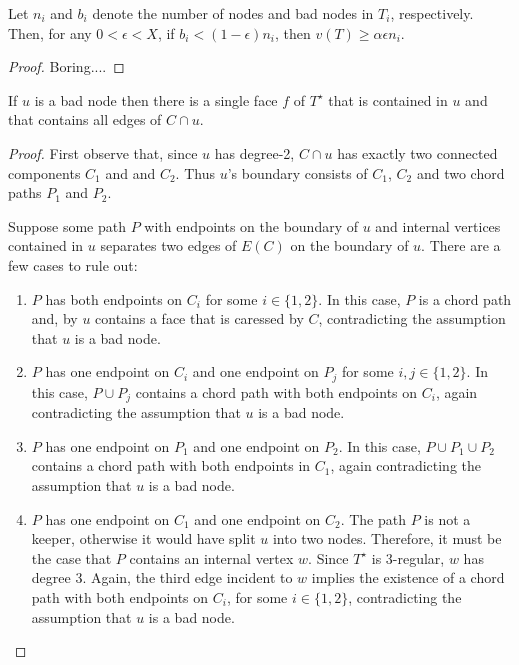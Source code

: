 \documentclass{patmorin}
\newcommand{\dual}[1]{{#1}^\star}
\begin{document}
\begin{lem}
   Let $n_i$ and $b_i$ denote the number of nodes and bad nodes in $T_i$, respectively.  Then, for any $0 < \epsilon < X$, if $b_i < (1-\epsilon)n_i$, then $v(T)\ge \alpha \epsilon n_i$.
\end{lem}

\begin{proof}
Boring....
\end{proof}


\begin{lem}
If $u$ is a bad node then there is a single face $f$ of $\dual{T}$ that is contained in $u$ and that contains all edges of $C\cap u$.
\end{lem}

\begin{proof}
   First observe that, since $u$ has degree-2, $C\cap u$ has exactly
   two connected components $C_1$ and and $C_2$. Thus $u$'s boundary
   consists of $C_1$, $C_2$ and two chord paths $P_1$ and $P_2$.

   Suppose some path $P$ with endpoints on the boundary of $u$ and
   internal vertices contained in $u$ separates two edges of $E(C)$
   on the boundary of $u$.  There are a few cases to rule out:
   \begin{enumerate}
       \item $P$ has both endpoints on $C_i$ for some $i\in\{1,2\}$. In
       this case, $P$ is a chord path and, by 
       $u$ contains a face that is caressed by $C$, contradicting the
       assumption that $u$ is a bad node.

       \item $P$ has one endpoint on $C_i$ and one endpoint on $P_j$
       for some $i,j\in\{1,2\}$.  In this case, $P\cup P_j$ contains a
       chord path with both endpoints on $C_i$, again contradicting the
       assumption that $u$ is a bad node.

       \item $P$ has one endpoint on $P_1$ and one endpoint on $P_2$.
       In this case, $P\cup P_1\cup P_2$ contains a chord path with both
       endpoints in $C_1$, again contradicting the assumption that $u$
       is a bad node.

       \item $P$ has one endpoint on $C_1$ and one endpoint on $C_2$.
       The path $P$ is not a keeper, otherwise it would have split $u$
       into two nodes.  Therefore, it must be the case that $P$ contains
       an internal vertex $w$. Since $\dual{T}$ is 3-regular, $w$ has
       degree 3.  Again, the third edge incident to $w$ implies the
       existence of a chord path with both endpoints on $C_i$, for some
       $i\in\{1,2\}$, contradicting the assumption that $u$ is a bad node.
\end{enumerate}
\end{proof}
\end{document}

